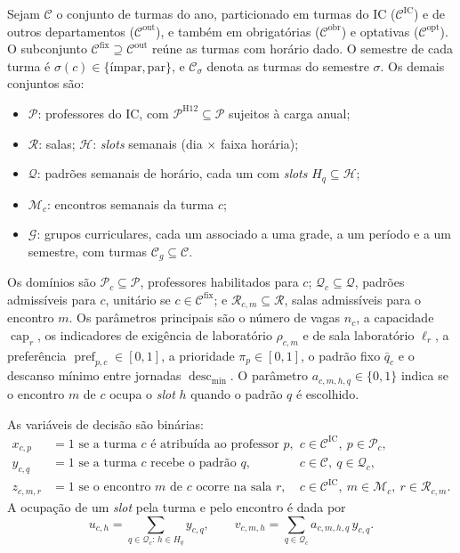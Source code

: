 Sejam $\mathcal{C}$ o conjunto de turmas do ano, particionado em turmas do IC ($\mathcal{C}^{\mathrm{IC}}$) e de outros departamentos ($\mathcal{C}^{\mathrm{out}}$), e também em obrigatórias ($\mathcal{C}^{\mathrm{obr}}$) e optativas ($\mathcal{C}^{\mathrm{opt}}$). O subconjunto $\mathcal{C}^{\mathrm{fix}}\supseteq\mathcal{C}^{\mathrm{out}}$ reúne as turmas com horário dado. O semestre de cada turma é $\sigma(c)\in\{\text{ímpar},\text{par}\}$, e $\mathcal{C}_\sigma$ denota as turmas do semestre $\sigma$. Os demais conjuntos são:
\begin{itemize}
  \setlength{\itemsep}{0pt}
  \item $\mathcal{P}$: professores do IC, com $\mathcal{P}^{\mathrm{H12}}\subseteq\mathcal{P}$ sujeitos à carga anual;
  \item $\mathcal{R}$: salas; $\mathcal{H}$: \textit{slots} semanais (dia $\times$ faixa horária);
  \item $\mathcal{Q}$: padrões semanais de horário, cada um com \textit{slots} $H_q\subseteq\mathcal{H}$;
  \item $\mathcal{M}_c$: encontros semanais da turma $c$;
  \item $\mathcal{G}$: grupos curriculares, cada um associado a uma grade, a um período e a um semestre, com turmas $\mathcal{C}_g\subseteq\mathcal{C}$.
\end{itemize}

Os domínios são $\mathcal{P}_c\subseteq\mathcal{P}$, professores habilitados para $c$; $\mathcal{Q}_c\subseteq\mathcal{Q}$, padrões admissíveis para $c$, unitário se $c\in\mathcal{C}^{\mathrm{fix}}$; e $\mathcal{R}_{c,m}\subseteq\mathcal{R}$, salas admissíveis para o encontro $m$. Os parâmetros principais são o número de vagas $n_c$, a capacidade $\operatorname{cap}_r$, os indicadores de exigência de laboratório $\rho_{c,m}$ e de sala laboratório $\ell_r$, a preferência $\operatorname{pref}_{p,c}\in[0,1]$, a prioridade $\pi_p\in[0,1]$, o padrão fixo $\bar q_c$ e o descanso mínimo entre jornadas $\operatorname{desc}_{\min}$. O parâmetro $a_{c,m,h,q}\in\{0,1\}$ indica se o encontro $m$ de $c$ ocupa o \textit{slot} $h$ quando o padrão $q$ é escolhido.

As variáveis de decisão são binárias:
\begin{align}
  x_{c,p}&=1 \text{ se a turma } c \text{ é atribuída ao professor } p, && c\in\mathcal{C}^{\mathrm{IC}},\ p\in\mathcal{P}_c,\\
  y_{c,q}&=1 \text{ se a turma } c \text{ recebe o padrão } q, && c\in\mathcal{C},\ q\in\mathcal{Q}_c,\\
  z_{c,m,r}&=1 \text{ se o encontro } m \text{ de } c \text{ ocorre na sala } r, && c\in\mathcal{C}^{\mathrm{IC}},\ m\in\mathcal{M}_c,\ r\in\mathcal{R}_{c,m}.
\end{align}
A ocupação de um \textit{slot} pela turma e pelo encontro é dada por
\begin{equation}
  u_{c,h}=\sum_{q\in\mathcal{Q}_c:\,h\in H_q} y_{c,q},
  \qquad
  v_{c,m,h}=\sum_{q\in\mathcal{Q}_c} a_{c,m,h,q}\,y_{c,q}.
\end{equation}

